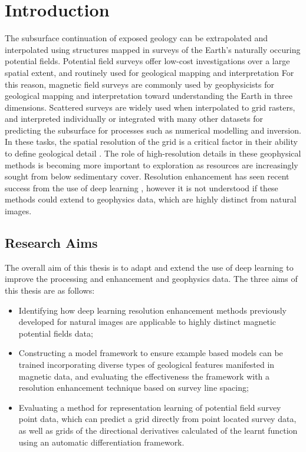 \documentclass[manuscript.tex]{subfiles}
\begin{document}
\chapter{Introduction}
\label{ch:intro}
The subsurface continuation of exposed geology can be extrapolated and interpolated using structures mapped in surveys of the Earth's naturally occuring potential fields.
Potential field surveys offer low-cost investigations over a large spatial extent, and routinely used for geological mapping and interpretation \parencite{nabighian75thAnniversaryHistorical2005}
For this reason, magnetic field surveys are commonly used by geophysicists for geological mapping and interpretation toward understanding the Earth in three dimensions.
Scattered surveys are widely used when interpolated to grid rasters, and interpreted individually or integrated with many other datasets for predicting the subsurface for processes such as numerical modelling and inversion.
In these tasks, the spatial resolution of the grid is a critical factor in their ability to define geological detail \parencite{islesGeologicalInterpretationAeromagnetic2018}.
The role of high-resolution details in these geophysical methods is becoming more important to exploration as resources are increasingly sought from below sedimentary cover.
Resolution enhancement has seen recent success from the use of deep learning \parencite{moserHitchhikerGuideSuperResolution2023}, however it is not understood if these methods could extend to geophysics data, which are highly distinct from natural images.

\section{Research Aims}
The overall aim of this thesis is to adapt and extend the use of deep learning to improve the processing and enhancement and geophysics data. The three aims of this thesis are as follows:

\begin{itemize}
    \item{} Identifying how deep learning resolution enhancement methods previously developed for natural images are applicable to highly distinct magnetic potential fields data;

    \item{} Constructing a model framework to ensure example based models can be trained incorporating diverse types of geological features manifested in magnetic data, and evaluating the effectiveness the framework with a resolution enhancement technique based on survey line spacing;

    \item{} Evaluating a method for representation learning of potential field survey point data, which can predict a grid directly from point located survey data, as well as grids of the directional derivatives calculated of the learnt function using an automatic differentiation framework.
\end{itemize}
\end{document}
